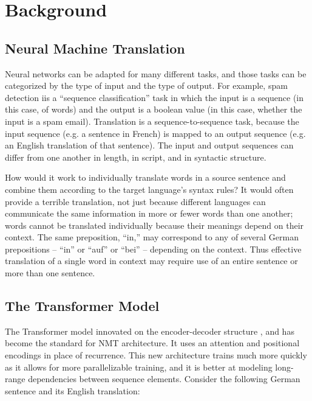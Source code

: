 \chapter{Background}
\label{chap:background}

\section{Neural Machine Translation}

Neural networks can be adapted for many different tasks, and those tasks can be categorized by the type of input and the type of output. For example, spam detection iis a “sequence classification” task in which the input is a sequence (in this case, of words) and the output is a boolean value (in this case, whether the input is a spam email). Translation is a sequence-to-sequence task, because the input sequence (e.g. a sentence in French) is mapped to an output sequence (e.g. an English translation of that sentence). The input and output sequences can differ from one another in length, in script, and in syntactic structure.

How would it work to individually translate words in a source sentence and combine them according to the target language’s syntax rules? It would often provide a terrible translation, not just because different languages can communicate the same information in more or fewer words than one another; words cannot be translated individually because their meanings depend on their context. The same preposition, “in,” may correspond to any of several German prepositions – “in” or “auf” or “bei” – depending on the context. Thus effective translation of a single word in context may require use of an entire sentence or more than one sentence.

\section{The Transformer Model}

The Transformer model \cite{vaswani2017attention} innovated on the encoder-decoder structure \cite{sutskever2014sequence}, and has become the standard for NMT architecture. It uses an attention \cite{bahdanau2014neural} and positional encodings in place of recurrence. This new architecture trains much more quickly as it allows for more parallelizable training, and it is better at modeling long-range dependencies between sequence elements. Consider the following German sentence and its English translation:

